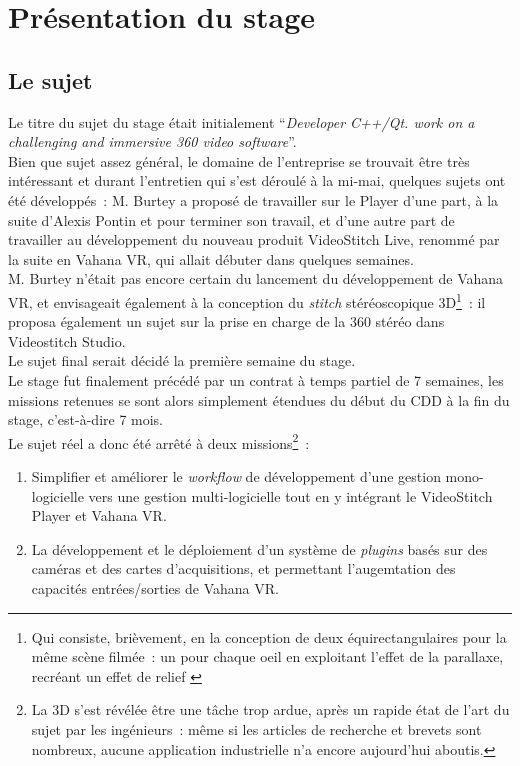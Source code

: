 \chapter{Présentation du stage}

\section{Le sujet}
\label{le-sujet}
Le titre du sujet du stage était initialement \enquote{\textit{Developer C++/Qt.
work on a challenging and immersive 360 video software}}.\\
Bien que sujet assez général, le domaine de l'entreprise se trouvait être très intéressant
et durant l'entretien qui s'est déroulé à la mi-mai, quelques sujets ont été
développés~: M. Burtey a proposé de travailler sur le Player d'une part,
à la suite d'Alexis Pontin et pour terminer son travail, et d'une autre part de
travailler au développement du nouveau produit VideoStitch Live, renommé par la
suite en Vahana VR, qui allait débuter dans quelques semaines.\\
M. Burtey n'était pas encore certain du lancement du développement de Vahana VR, 
et envisageait également à la conception du \textit{stitch} stéréoscopique 3D\footnote{Qui
consiste, brièvement, en la conception de deux équirectangulaires pour la même
scène filmée~: un pour chaque oeil en exploitant l'effet de la parallaxe, recréant 
un effet de relief\cite{videostitch-stereo}
\cite{image-stereoscopique}}~: il proposa également un sujet sur 
la prise en charge de la 360 stéréo dans Videostitch Studio.\\
Le sujet final serait décidé la première semaine du stage.\\
\newline
Le stage fut finalement précédé par un contrat à temps partiel de 7 semaines, les missions retenues
se sont alors simplement étendues du début du CDD à la fin du stage, c'est-à-dire 
7 mois.\\
Le sujet réel a donc été arrêté à deux missions\footnote{La 3D s'est révélée être 
une tâche trop ardue, après un rapide état de l'art du sujet par les ingénieurs~: 
même si les articles de recherche et brevets sont nombreux, aucune application 
industrielle n'a encore aujourd'hui aboutis.}~:
\begin{enumerate}
  \item Simplifier et améliorer le \textit{workflow} de développement d'une
  gestion mono-logicielle vers une gestion multi-logicielle tout en y intégrant 
  le VideoStitch Player et Vahana VR.
  \item La développement et le déploiement d'un système de \textit{plugins} basés
  sur des caméras et des cartes d'acquisitions, et permettant l'augemtation des
  capacités entrées/sorties de Vahana VR.
\end{enumerate}
